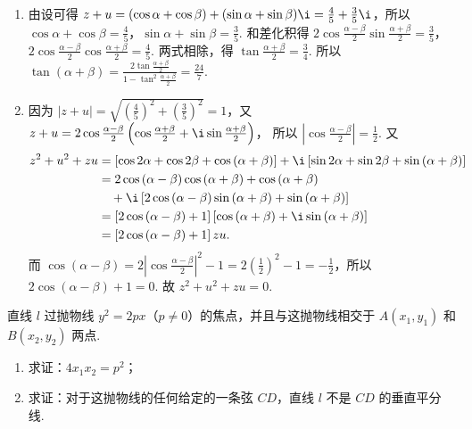 \documentclass[UTF8,a4paper,oneside,11pt]{ctexbook}
\begin{document}
\begin{solution}
\begin{enumerate}
\item 由设可得 \(z + u = (\cos \alpha + \cos \beta) + (\sin \alpha + \sin \beta)\i = \frac{4}{5}+\frac{3}{5}\i\)，所以 \(\cos\alpha+\cos\beta=\frac{4}{5}\)，\(\sin\alpha+\sin\beta=\frac{3}{5}\). 和差化积得
\(2\cos\frac{\alpha-\beta}{2}\sin\frac{\alpha+\beta}{2}=\frac{3}{5}\)，\(2\cos\frac{\alpha-\beta}{2}\cos\frac{\alpha+\beta}{2}=\frac{4}{5}\).
两式相除，得 \(\tan\frac{\alpha+\beta}{2}=\frac{3}{4}\). 所以
\(\tan(\alpha+\beta)=\frac{2\tan\frac{\alpha+\beta}{2}}{1-\tan^{2}\frac{\alpha+\beta}{2}}=\frac{24}{7}\).

\item 因为 \(\left|z + u\right| = \sqrt{\left(\frac{4}{5}\right)^2 + \left(\frac{3}{5}\right)^2} = 1\)，又
\(z + u = 2 \cos \frac{\alpha - \beta}{2} \left( \cos \frac{\alpha + \beta}{2} + \i \sin \frac{\alpha + \beta}{2} \right)\)，
所以 \(\left|\cos \frac{\alpha - \beta}{2}\right| = \frac{1}{2}\). 又
\[
\begin{aligned}
z^{2}+u^{2}+zu
&=\left[\cos2\alpha+\cos2\beta+\cos\left(\alpha+\beta\right)\right]+\i\left[\sin2\alpha+\sin2\beta+\sin\left(\alpha+\beta\right)\right]\\
&=2\cos\left(\alpha-\beta\right)\cos\left(\alpha+\beta\right)+\cos\left(\alpha+\beta\right)\\
&\quad +\i\left[2\cos\left(\alpha-\beta\right)\sin\left(\alpha+\beta\right)+\sin\left(\alpha+\beta\right)\right]\\
&=\left[2\cos\left(\alpha-\beta\right)+1\right]\left[\cos\left(\alpha+\beta\right)+\i\sin\left(\alpha+\beta\right)\right]\\
&=\left[2\cos\left(\alpha-\beta\right)+1\right]zu.
\end{aligned}
\]
而 \(\cos(\alpha-\beta)=2\left|\cos\frac{\alpha-\beta}{2}\right|^{2}-1=2\left(\frac{1}{2}\right)^{2}-1=-\frac{1}{2}\)，所以 \(2\cos(\alpha-\beta)+1=0\). 故 \(z^{2}+u^{2}+zu=0\).
\end{enumerate}
\end{solution}

\begin{problem}

直线 \(l\) 过抛物线 \(y^{2}=2px\)（\(p\neq0\)）的焦点，并且与这抛物线相交于 \(A\left(x_{1},y_{1}\right)\) 和 \(B\left(x_{2},y_{2}\right)\) 两点.

\begin{enumerate}
\item 求证：\(4x_{1}x_{2}=p^{2}\)；
\item 求证：对于这抛物线的任何给定的一条弦 \(CD\)，直线 \(l\) 不是 \(CD\) 的垂直平分线.
\end{enumerate}
\end{problem}
\end{document}
